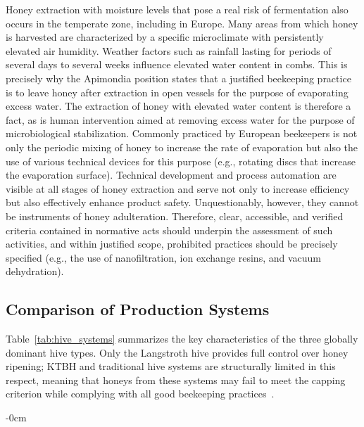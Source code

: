 \documentclass[foods,review,accept,pdftex,moreauthors]{Definitions/mdpi}
\begin{document}
{Honey extraction with moisture levels that pose a real risk of
fermentation also occurs in the temperate zone, including in
Europe. Many areas from which honey is harvested are characterized
by a specific microclimate with persistently elevated air humidity.
Weather factors such as rainfall lasting for periods of several
days to several weeks influence elevated water content in combs.
This is precisely why the Apimondia position states that a justified
beekeeping practice is to leave honey after extraction in open
vessels for the purpose of evaporating excess water. The extraction of
honey with elevated water content is therefore a fact, as is human
intervention aimed at removing excess water for the purpose of
microbiological stabilization. Commonly practiced by European
beekeepers is not only the periodic mixing of honey to increase the rate
of evaporation but also the use of various technical devices for
this purpose (e.g., rotating discs that increase the evaporation
surface). Technical development and process automation are visible
at all stages of honey extraction and serve not only to increase
efficiency but also effectively enhance product safety.
Unquestionably, however, they cannot be instruments of honey
adulteration. Therefore, clear, accessible, and verified criteria
contained in normative acts should underpin the assessment of such
activities, and within justified scope, prohibited practices should
be precisely specified (e.g., the use of nanofiltration, ion exchange
resins, and vacuum dehydration).

\subsection{Comparison of Production Systems}


Table~\ref{tab:hive_systems} summarizes the key characteristics of
the three globally dominant hive types. Only the Langstroth hive
provides full control over honey ripening; KTBH and traditional
hive systems are structurally limited in this respect, meaning that
honeys from these systems may fail to meet the capping criterion
while complying with all good beekeeping
practices~\cite{tadele2025,sciendo2012,lrrd2013}.

\begin{table}[H]
\caption{Comparison of beekeeping production systems with respect to
         honey maturity control. Source: own compilation
         based on~\cite{tadele2025,sciendo2012,lrrd2013}.}
\label{tab:hive_systems}
\begin{adjustwidth}{-\extralength}{0cm}


\end{adjustwidth}
\end{table}}
\end{document}
